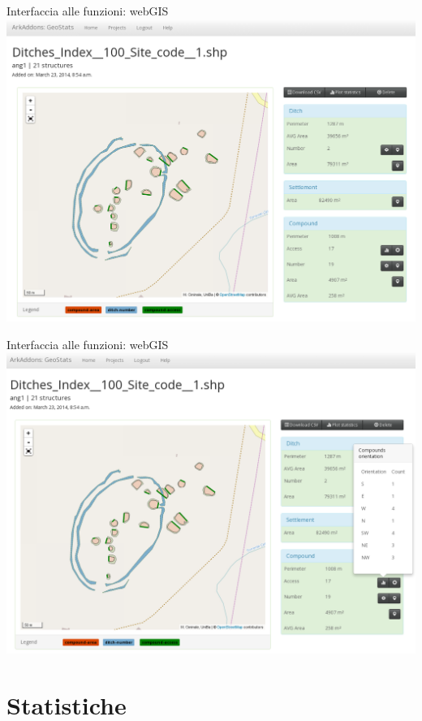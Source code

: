 \documentclass[xcolor=svgnames]{beamer}
\begin{document}
        \begin{frame}{Interfaccia alle funzioni: webGIS}
            \includegraphics[width=1\textwidth]{img/shp-detail-4}
        \end{frame}

        \begin{frame}{Interfaccia alle funzioni: webGIS}
            \includegraphics[width=1\textwidth]{img/shp-detail-5}
        \end{frame}

    \section{Statistiche}
\end{document}

